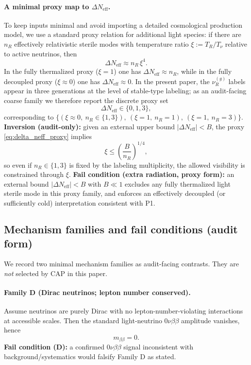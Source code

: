 \paragraph{A minimal proxy map to $\Delta N_\mathrm{eff}$.}
\MatchTag To keep inputs minimal and avoid importing a detailed cosmological production model,
we use a standard proxy relation for additional light species:
if there are $n_R$ effectively relativistic sterile modes with temperature ratio $\xi:=T_R/T_\nu$ relative to active neutrinos,
then
\begin{equation}\label{eq:delta_neff_proxy}
\Delta N_\mathrm{eff}\approx n_R\,\xi^4.
\end{equation}
In the fully thermalized proxy ($\xi=1$) one has $\Delta N_\mathrm{eff}\approx n_R$,
while in the fully decoupled proxy ($\xi\approx 0$) one has $\Delta N_\mathrm{eff}\approx 0$.
In the present paper, the $\nu_R^{(g)}$ labels appear in three generations at the level of stable-type labeling;
as an audit-facing coarse family we therefore report the discrete proxy set
\[
\Delta N_\mathrm{eff}\in\{0,1,3\},
\]
corresponding to $\{(\xi\approx 0,\ n_R\in\{1,3\}),\ (\xi=1,\ n_R=1),\ (\xi=1,\ n_R=3)\}$.
\textbf{Inversion (audit-only):}
given an external upper bound $|\Delta N_\mathrm{eff}|<B$, the proxy \eqref{eq:delta_neff_proxy} implies
\[
\xi\le \left(\frac{B}{n_R}\right)^{1/4},
\]
so even if $n_R\in\{1,3\}$ is fixed by the labeling multiplicity, the allowed visibility is constrained through $\xi$.
\textbf{Fail condition (extra radiation, proxy form):}
an external bound $|\Delta N_\mathrm{eff}|<B$ with $B\ll 1$ excludes any fully thermalized light sterile mode in this proxy family,
and enforces an effectively decoupled (or sufficiently cold) interpretation consistent with P1.

\subsection{Mechanism families and fail conditions (audit form)}
\label{subsec:neutrino_mechanism_audit_fails}

We record two minimal mechanism families as audit-facing contrasts.
They are \emph{not} selected by CAP in this paper.

\paragraph{Family D (Dirac neutrinos; lepton number conserved).}
Assume neutrinos are purely Dirac with no lepton-number-violating interactions at accessible scales.
Then the standard light-neutrino 0$\nu\beta\beta$ amplitude vanishes, hence
\begin{equation}\label{eq:dirac_mbb_zero}
m_{\beta\beta}=0.
\end{equation}
\textbf{Fail condition (D):}
a confirmed 0$\nu\beta\beta$ signal inconsistent with background/systematics would falsify Family D as stated.

